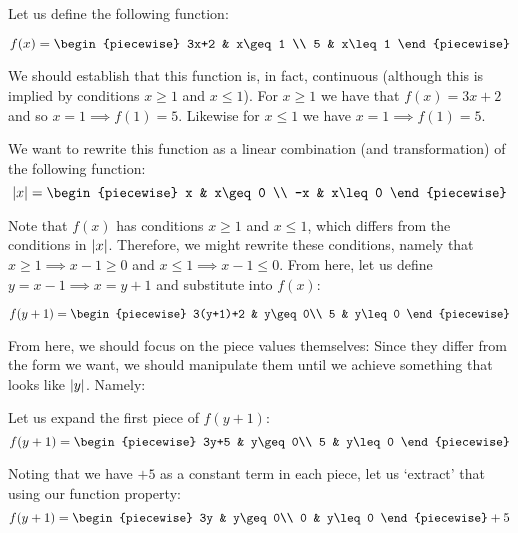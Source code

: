 \begin{example}
    \label{example:algebra_1}
    Let us define the following function:

    $$
        f(x)=\begin{piecewise}
            3x+2 & x\geq 1 \\
            5 & x\leq 1
        \end{piecewise}
    $$

    We should establish that this function is, in fact, continuous (although this is implied by conditions $x\geq 1$ and $x\leq 1$). For $x\geq 1$ we have that $f(x)=3x+2$ and so $x=1\implies f(1)=5$. Likewise for $x\leq 1$ we have $x=1\implies f(1)=5$.

    We want to rewrite this function as a linear combination (and transformation) of the following function:
    $$
        \abs{x}=\begin{piecewise}
            x & x\geq 0 \\
            -x & x\leq 0
        \end{piecewise}
    $$

    Note that $f(x)$ has conditions $x\geq 1$ and $x\leq 1$, which differs from the conditions in $\abs{x}$. Therefore, we might rewrite these conditions, namely that $x\geq 1\implies x-1\geq 0$ and $x\leq 1\implies x-1\leq 0$. From here, let us define $y=x-1\implies x=y+1$ and substitute into $f(x)$:

    $$
        f(y+1)=\begin{piecewise}
            3(y+1)+2 & y\geq 0\\
            5 & y\leq 0
        \end{piecewise}
    $$

    From here, we should focus on the piece values themselves: Since they differ from the form we want, we should manipulate them until we achieve something that looks like $\abs{y}$. Namely:

    Let us expand the first piece of $f(y+1)$:
    $$
        f(y+1) = \begin{piecewise}
            3y+5 & y\geq 0\\
            5 & y\leq 0
        \end{piecewise}
    $$

    Noting that we have $+5$ as a constant term in each piece, let us `extract' that using our function property:
    $$
        f(y+1) = \begin{piecewise}
            3y & y\geq 0\\
            0 & y\leq 0
        \end{piecewise}+5
    $$


\end{example}
